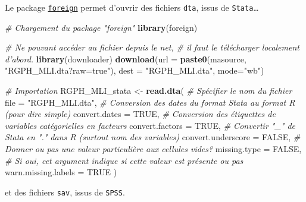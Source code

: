 \documentclass[]{book}
\newenvironment{Shaded}{\begin{snugshade}}{\end{snugshade}}
\newcommand{\KeywordTok}[1]{\textcolor[rgb]{0.13,0.29,0.53}{\textbf{#1}}}
\newcommand{\DataTypeTok}[1]{\textcolor[rgb]{0.13,0.29,0.53}{#1}}
\newcommand{\StringTok}[1]{\textcolor[rgb]{0.31,0.60,0.02}{#1}}
\newcommand{\CommentTok}[1]{\textcolor[rgb]{0.56,0.35,0.01}{\textit{#1}}}
\newcommand{\OtherTok}[1]{\textcolor[rgb]{0.56,0.35,0.01}{#1}}
\newcommand{\NormalTok}[1]{#1}
\begin{document}
Le package
\href{https://cran.r-project.org/web/packages/foreign/index.html}{\texttt{foreign}}
permet d'ouvrir des fichiers \texttt{dta}, issus de
\texttt{Stata}\ldots{}

\begin{Shaded}
\begin{Highlighting}[]
\CommentTok{# Chargement du package "foreign"}
\KeywordTok{library}\NormalTok{(foreign) }

\CommentTok{# Ne pouvant accéder au fichier depuis le net,}
\CommentTok{# il faut le télécharger localement d'abord.}
\KeywordTok{library}\NormalTok{(downloader)}
\KeywordTok{download}\NormalTok{(}\DataTypeTok{url =} \KeywordTok{paste0}\NormalTok{(masource, }\StringTok{"RGPH_MLI.dta?raw=true"}\NormalTok{), }
         \DataTypeTok{dest =} \StringTok{"RGPH_MLI.dta"}\NormalTok{, }
         \DataTypeTok{mode=}\StringTok{"wb"}\NormalTok{)}

\CommentTok{# Importation}
\NormalTok{RGPH_MLI_stata <-}\StringTok{ }\KeywordTok{read.dta}\NormalTok{(}
  \CommentTok{# Spécifier le nom du fichier}
  \DataTypeTok{file =} \StringTok{"RGPH_MLI.dta"}\NormalTok{,}
  \CommentTok{# Conversion des dates du format Stata au format R (pour dire simple)}
  \DataTypeTok{convert.dates =} \OtherTok{TRUE}\NormalTok{, }
  \CommentTok{# Conversion des étiquettes de variables catégorielles en facteurs}
  \DataTypeTok{convert.factors =} \OtherTok{TRUE}\NormalTok{, }
  \CommentTok{# Convertir "_" de Stata en "." dans R (surtout nom des variables)}
  \DataTypeTok{convert.underscore =} \OtherTok{FALSE}\NormalTok{, }
  \CommentTok{# Donner ou pas une valeur particulière aux cellules vides?}
  \DataTypeTok{missing.type =} \OtherTok{FALSE}\NormalTok{, }
  \CommentTok{# Si oui, cet argument indique si cette valeur est présente ou pas}
  \DataTypeTok{warn.missing.labels =} \OtherTok{TRUE} 
\NormalTok{)}
\end{Highlighting}
\end{Shaded}

et des fichiers \texttt{sav}, issus de \texttt{SPSS}.
\end{document}

